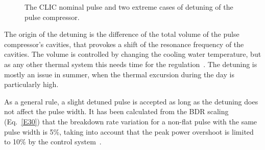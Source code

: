  
\begin{figure}[h]
\centering
{}
\hspace{2mm}
\caption{The CLIC nominal pulse and two extreme cases of detuning of the pulse compressor.}
\label{detuning_fig}
\end{figure}
 



The origin of the detuning is the difference of the total volume of the pulse compressor's cavities, that provokes a shift of the resonance frequency of the cavities. The volume is controlled by changing the cooling water temperature, but as any other thermal system this needs time for the regulation~\cite{Woolley:CWS2016}. The detuning is mostly an issue in summer, when the thermal excursion during the day is particularly high.

As a general rule, a slight detuned pulse is accepted as long as the detuning does not affect the pulse width. It has been calculated from the BDR scaling (Eq.~\ref{E30}) that the breakdown rate variation for a non-flat pulse with the same pulse width is 5\%, taking into account that the peak power overshoot is limited to 10\% by the control system~\cite{Frank:PC}.  

